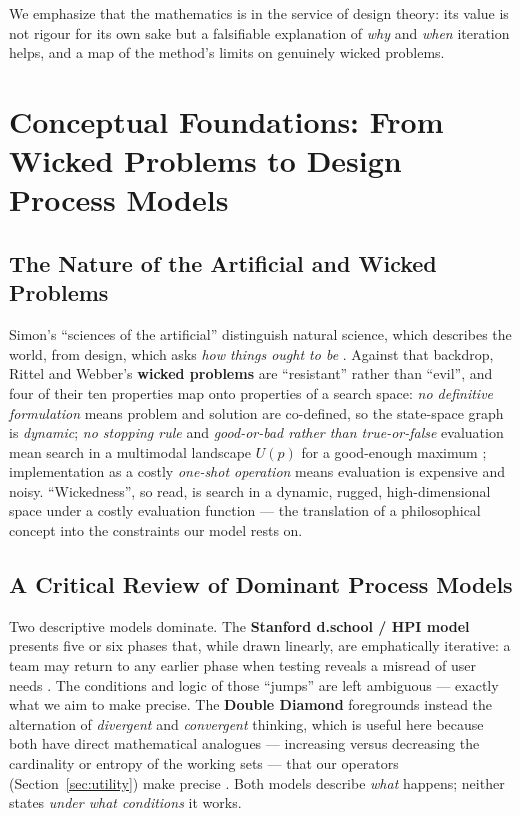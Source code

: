 \documentclass[11pt]{article}
\begin{document}
We emphasize that the mathematics is in the service of design theory: its value is not rigour for its own sake but a falsifiable explanation of \emph{why} and \emph{when} iteration helps, and a map of the method's limits on genuinely wicked problems.

\section{Conceptual Foundations: From Wicked Problems to Design Process Models}

\subsection{The Nature of the Artificial and Wicked Problems}

Simon's ``sciences of the artificial'' distinguish natural science, which describes the world, from design, which asks \textit{how things ought to be} \citep{simon1996}. Against that backdrop, Rittel and Webber's \textbf{wicked problems} \citep{rittel1973, thomas2021, chen2022} are ``resistant'' rather than ``evil'', and four of their ten properties map onto properties of a search space: \emph{no definitive formulation} means problem and solution are co-defined, so the state-space graph is \emph{dynamic}; \emph{no stopping rule} and \emph{good-or-bad rather than true-or-false} evaluation mean search in a multimodal landscape $U(p)$ for a good-enough maximum \citep{wikipediaNDb, smith2025}; implementation as a costly \emph{one-shot operation} means evaluation is expensive and noisy. ``Wickedness'', so read, is search in a dynamic, rugged, high-dimensional space under a costly evaluation function --- the translation of a philosophical concept into the constraints our model rests on.

\subsection{A Critical Review of Dominant Process Models}

Two descriptive models dominate. The \textbf{Stanford d.school / HPI model} presents five or six phases that, while drawn linearly, are emphatically iterative: a team may return to any earlier phase when testing reveals a misread of user needs \citep{plattner2011, brenner2016, abrell2016}. The conditions and logic of those ``jumps'' are left ambiguous --- exactly what we aim to make precise. The \textbf{Double Diamond} \citep{designcouncilNDa} foregrounds instead the alternation of \emph{divergent} and \emph{convergent} thinking, which is useful here because both have direct mathematical analogues --- increasing versus decreasing the cardinality or entropy of the working sets --- that our operators (Section~\ref{sec:utility}) make precise \citep{hermsen2015, menning2018, designcouncilNDb}. Both models describe \textit{what} happens; neither states \textit{under what conditions} it works.
\end{document}
